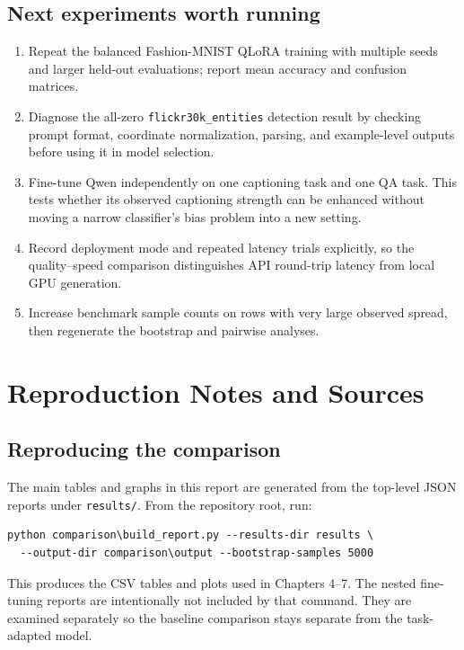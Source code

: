 \documentclass[11pt,a4paper]{report}
\newcommand{\code}[1]{\texttt{#1}}
\begin{document}
\section{Next experiments worth running}
\begin{enumerate}[leftmargin=22pt]
\item Repeat the balanced Fashion-MNIST QLoRA training with multiple seeds and
larger held-out evaluations; report mean accuracy and confusion matrices.
\item Diagnose the all-zero \code{flickr30k\_entities} detection result by
checking prompt format, coordinate normalization, parsing, and example-level
outputs before using it in model selection.
\item Fine-tune Qwen independently on one captioning task and one QA task.
This tests whether its observed captioning strength can be enhanced without
moving a narrow classifier's bias problem into a new setting.
\item Record deployment mode and repeated latency trials explicitly, so the
quality--speed comparison distinguishes API round-trip latency from local GPU
generation.
\item Increase benchmark sample counts on rows with very large observed
spread, then regenerate the bootstrap and pairwise analyses.
\end{enumerate}

\clearpage
\chapter*{Reproduction Notes and Sources}

\section*{Reproducing the comparison}
The main tables and graphs in this report are generated from the top-level
JSON reports under \code{results/}.  From the repository root, run:

\begin{verbatim}
python comparison\build_report.py --results-dir results \
  --output-dir comparison\output --bootstrap-samples 5000
\end{verbatim}

This produces the CSV tables and plots used in Chapters 4--7.  The nested
fine-tuning reports are intentionally not included by that command.  They are
examined separately so the baseline comparison stays separate from the
task-adapted model.
\end{document}
